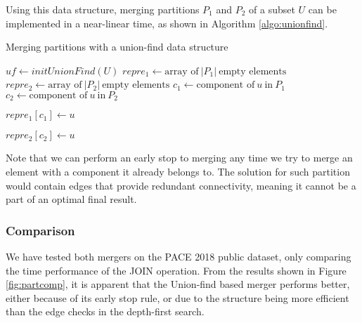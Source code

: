 \documentclass[thesis=M,english,hidelinks]{FITthesis}[2012/10/20]
\theoremstyle{definition}
\begin{document}
Using this data structure, merging partitions $P_1$ and $P_2$ of a subset $U$ can be implemented in a near-linear
time, as shown in Algorithm \ref{algo:unionfind}.

\begin{algorithm}
    \caption{Merging partitions with a union-find data structure}
    \label{algo:unionfind}
    \begin{algorithmic}[1]
        \State $uf \gets initUnionFind(U)$
        \State $repre_1 \gets \text{array of}\ |P_1|\ \text{empty elements}$
        \State $repre_2 \gets \text{array of}\ |P_2|\ \text{empty elements}$
            \State $c_1 \gets \text{component of}\ u\ \text{in}\ P_1$ 
            \State $c_2 \gets \text{component of}\ u\ \text{in}\ P_2$ 

                \State $repre_1[c_1] \gets u$
            \Else
                    \State {}
                \EndIf
            \EndIf

                \State $repre_2[c_2] \gets u$
            \Else
                    \State {}
                \EndIf
            \EndIf
        \EndFor

        \State {}
    \end{algorithmic}
\end{algorithm}

Note that we can perform an early stop to merging any time we try to merge an element with a component it already
belongs to. The solution for such partition would contain edges that provide redundant connectivity, meaning it cannot
be a part of an optimal final result.

\subsubsection*{Comparison}

We have tested both mergers on the PACE 2018 public dataset, only comparing the time performance of the JOIN operation.
From the results shown in Figure \ref{fig:partcomp}, it is apparent that the Union-find based merger performs better,
either because of its early stop rule, or due to the structure being more efficient than the edge checks in the
depth-first search.
\end{document}
